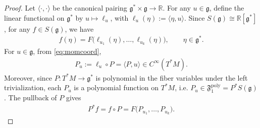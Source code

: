 \documentclass[11pt]{amsart}
\theoremstyle{definition}
\theoremstyle{plain}
\theoremstyle{conclusion}
\begin{document}
\begin{proof}
 Let $\langle \cdot,\cdot \rangle$ be the canonical pairing $\mathfrak{g}^* \times \mathfrak{g} \rightarrow \mathbb{R}$. For any $u \in \mathfrak{g}$, define the linear functional on $\mathfrak{g}^*$ by $u\mapsto \ell_u$, with $\ell_u(\eta):=\langle \eta,u\rangle $. Since $S(\mathfrak{g}) \cong \mathbb{R}[\mathfrak{g}^*]$, for any $f\in S(\mathfrak{g})$, we have \begin{align*}
f(\eta) = F\big(\ell_{u_1}(\eta),\ldots,\ell_{u_k}(\eta)\big),\qquad \eta \in\mathfrak{g}^*.
\end{align*} For $u\in\mathfrak{g}$, from \eqref{eq:momcoord}, \begin{align*}
P_u:=\ell_u\circ P=\langle P, u\rangle \in C^\infty(T^*M).
\end{align*} Moreover, since $P:T^*M\to \mathfrak{g}^*$ is polynomial in the fiber variables under the left trivialization, each $P_u$ is a polynomial function on $T^*M$, i.e. $P_u\in \mathfrak{F}_1^{\mathrm{poly}}=P^*S(\mathfrak{g})$.
 The pullback of $P$ gives \begin{align}
P^*f = f\circ P = F\big(P_{u_1},\ldots,P_{u_k}\big).%
\label{eq:comp}
\end{align} 


\end{proof}
\end{document}
